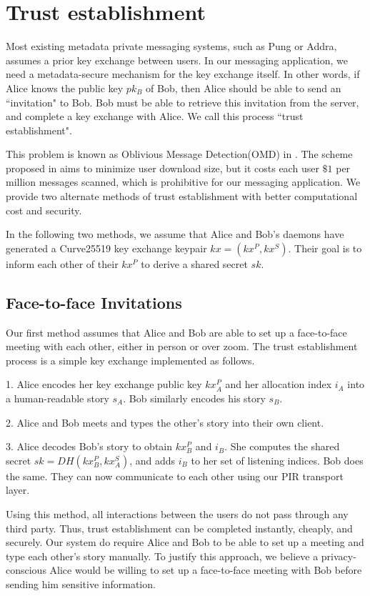 \section{Trust establishment}
\label{sec:trustestablishment}

Most existing metadata private messaging systems, such as Pung or Addra, assumes a prior key exchange between users. In our messaging application, we need a metadata-secure mechanism for the key exchange itself. In other words, if Alice knows the public key $pk_B$ of Bob, then Alice should be able to send an ``invitation" to Bob. Bob must be able to retrieve this invitation from the server, and complete a key exchange with Alice. We call this process ``trust establishment".

This problem is known as Oblivious Message Detection(OMD) in \cite{liutromer2021}. The scheme proposed in \cite{liutromer2021} aims to minimize user download size, but it costs each user $\$ 1$ per million messages scanned, which is prohibitive for our messaging application. We provide two alternate methods of trust establishment with better computational cost and security.

In the following two methods, we assume that Alice and Bob's daemons have generated a Curve25519 key exchange keypair $kx = (kx^P, kx^S)$. Their goal is to inform each other of their $kx^P$ to derive a shared secret $sk$.

\subsection{Face-to-face Invitations}
Our first method assumes that Alice and Bob are able to set up a face-to-face meeting with each other, either in person or over zoom. The trust establishment process is a simple key exchange implemented as follows.

1. Alice encodes her key exchange public key $kx_A^P$ and her allocation index $i_A$ into a human-readable story $s_A$. Bob similarly encodes his story $s_B$.

2. Alice and Bob meets and types the other's story into their own client. 

3. Alice decodes Bob's story to obtain $kx^P_B$ and $i_B$. She computes the shared secret $sk = DH(kx^P_B, kx^S_A)$, and adds $i_B$ to her set of listening indices. Bob does the same. They can now communicate to each other using our PIR transport layer.

Using this method, all interactions between the users do not pass through any third party. Thus, trust establishment can be completed instantly, cheaply, and securely. Our system do require Alice and Bob to be able to set up a meeting and type each other's story manually. To justify this approach, we believe a privacy-conscious Alice would be willing to set up a face-to-face meeting with Bob before sending him sensitive information.

